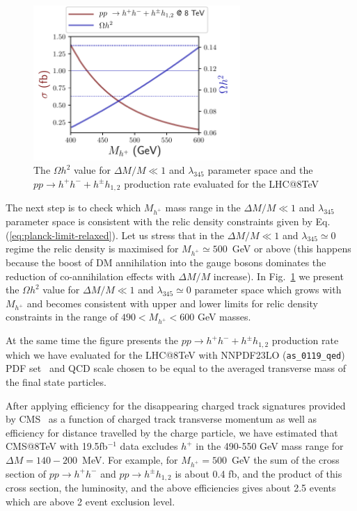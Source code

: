 \documentclass[12pt,a4paper]{article}
\begin{document}
{\begin{figure}[htb]
\begin{center}
  \includegraphics[width=0.7\textwidth]{sigma_h+.pdf}%
  \caption{The $\Omega h^2$ value for $\Delta M/M\ll 1$ and $\lambda_{345}$ parameter space and the $pp\to h^+h^- + h^\pm h_{1,2}$ 
production rate  evaluated for the LHC@8TeV}
  \label{fig:sigmah+}
\end{center}
\end{figure}
The next step is to check which $M_{h^+}$ mass range 
in the $\Delta M/M\ll 1$ and $\lambda_{345}$ parameter space 
is consistent with the relic density constraints
given by Eq.(\ref{eq:planck-limit-relaxed}).
Let us stress that in the  $\Delta M/M\ll 1$ and $\lambda_{345}\simeq 0$ regime 
the relic density is maximised for $M_{h^+}\simeq 500$~GeV or above
(this happens because the boost of DM annihilation into the gauge bosons
 dominates the reduction of co-annihilation effects
with $\Delta M/M$ increase).
In Fig.~\ref{fig:sigmah+} we present 
the $\Omega h^2$ value for $\Delta M/M\ll 1$ and $\lambda_{345}\simeq 0$ parameter space
which grows with $M_{h^+}$ and becomes consistent with upper and lower limits for relic density constraints in the range of $490< M_{h^+} <600$ GeV  
masses.

At the same time the figure presents the $pp\to h^+h^- + h^\pm h_{1,2}$ 
production rate which we have evaluated for the LHC@8TeV
with NNPDF23LO (\verb|as_0119_qed|) 
PDF set~\cite{Ball:2012cx}
and QCD scale chosen to be equal to the averaged transverse mass of the
final state particles.



After applying efficiency for the  disappearing charged track signatures provided by  CMS~\cite{CMS:2014gxa}
as a function of charged track transverse momentum as well as efficiency for distance travelled by the charge particle,
we have estimated  that CMS@8TeV with 19.5fb$^{-1}$ data excludes  $h^+$  in the 490-550 GeV mass range for   $\Delta M=140-200$~MeV.
For example, for $M_{h^+}=500$~GeV the sum of the cross section of $pp\to{h^+}{h^-}$ and  $pp\to{h^\pm}{h_{1,2}}$
is about 0.4 fb, and the product of this cross section, the luminosity, and the above efficiencies gives about 2.5 events
which are above 2 event exclusion level.


}
\end{document}
